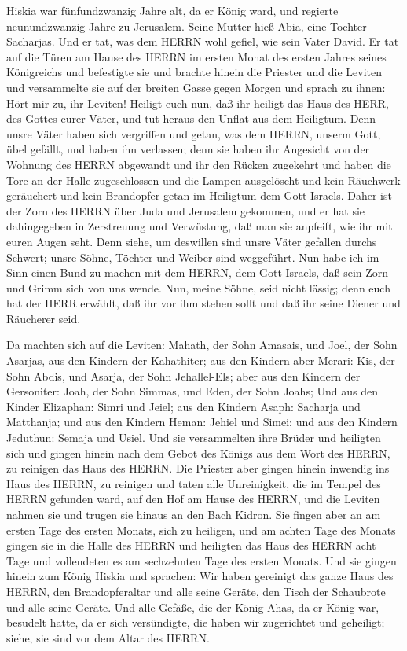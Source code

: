  Hiskia war fünfundzwanzig Jahre alt, da er König ward, und
regierte neunundzwanzig Jahre zu Jerusalem. Seine Mutter hieß Abia, eine
Tochter Sacharjas.  Und er tat, was dem HERRN wohl gefiel,
wie sein Vater David.  Er tat auf die Türen am Hause des
HERRN im ersten Monat des ersten Jahres seines Königreichs und
befestigte sie  und brachte hinein die Priester und die
Leviten und versammelte sie auf der breiten Gasse gegen Morgen
 und sprach zu ihnen: Hört mir zu, ihr Leviten! Heiligt euch
nun, daß ihr heiligt das Haus des HERR, des Gottes eurer Väter, und tut
heraus den Unflat aus dem Heiligtum.  Denn unsre Väter haben
sich vergriffen und getan, was dem HERRN, unserm Gott, übel gefällt, und
haben ihn verlassen; denn sie haben ihr Angesicht von der Wohnung des
HERRN abgewandt und ihr den Rücken zugekehrt  und haben die
Tore an der Halle zugeschlossen und die Lampen ausgelöscht und kein
Räuchwerk geräuchert und kein Brandopfer getan im Heiligtum dem Gott
Israels.  Daher ist der Zorn des HERRN über Juda und
Jerusalem gekommen, und er hat sie dahingegeben in Zerstreuung und
Verwüstung, daß man sie anpfeift, wie ihr mit euren Augen seht.
 Denn siehe, um deswillen sind unsre Väter gefallen durchs
Schwert; unsre Söhne, Töchter und Weiber sind weggeführt. 
Nun habe ich im Sinn einen Bund zu machen mit dem HERRN, dem Gott
Israels, daß sein Zorn und Grimm sich von uns wende.  Nun,
meine Söhne, seid nicht lässig; denn euch hat der HERR erwählt, daß ihr
vor ihm stehen sollt und daß ihr seine Diener und Räucherer seid.

 Da machten sich auf die Leviten: Mahath, der Sohn Amasais,
und Joel, der Sohn Asarjas, aus den Kindern der Kahathiter; aus den
Kindern aber Merari: Kis, der Sohn Abdis, und Asarja, der Sohn
Jehallel-Els; aber aus den Kindern der Gersoniter: Joah, der Sohn
Simmas, und Eden, der Sohn Joahs;  Und aus den Kinder
Elizaphan: Simri und Jeiel; aus den Kindern Asaph: Sacharja und
Matthanja;  und aus den Kindern Heman: Jehiel und Simei;
und aus den Kindern Jeduthun: Semaja und Usiel.  Und sie
versammelten ihre Brüder und heiligten sich und gingen hinein nach dem
Gebot des Königs aus dem Wort des HERRN, zu reinigen das Haus des HERRN.
 Die Priester aber gingen hinein inwendig ins Haus des
HERRN, zu reinigen und taten alle Unreinigkeit, die im Tempel des HERRN
gefunden ward, auf den Hof am Hause des HERRN, und die Leviten nahmen
sie und trugen sie hinaus an den Bach Kidron.  Sie fingen
aber an am ersten Tage des ersten Monats, sich zu heiligen, und am
achten Tage des Monats gingen sie in die Halle des HERRN und heiligten
das Haus des HERRN acht Tage und vollendeten es am sechzehnten Tage des
ersten Monats.  Und sie gingen hinein zum König Hiskia und
sprachen: Wir haben gereinigt das ganze Haus des HERRN, den
Brandopferaltar und alle seine Geräte, den Tisch der Schaubrote und alle
seine Geräte.  Und alle Gefäße, die der König Ahas, da er
König war, besudelt hatte, da er sich versündigte, die haben wir
zugerichtet und geheiligt; siehe, sie sind vor dem Altar des HERRN.

